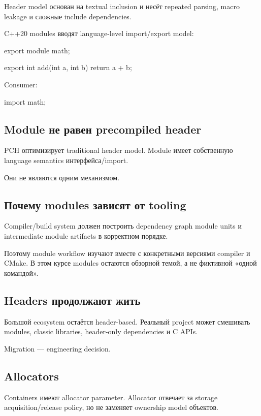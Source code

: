 Header model основан на textual inclusion и несёт repeated parsing, macro
leakage и сложные include dependencies.

C++20 modules вводят language-level import/export model:

\begin{cppcode}
export module math;

export int add(int a, int b) {
    return a + b;
}
\end{cppcode}

Consumer:

\begin{cppcode}
import math;
\end{cppcode}

\subsection{Module не равен precompiled header}

PCH оптимизирует traditional header model. Module имеет собственную language
semantics интерфейса/import.

Они не являются одним механизмом.

\subsection{Почему modules зависят от tooling}

Compiler/build system должен построить dependency graph module units и
intermediate module artifacts в корректном порядке.

Поэтому module workflow изучают вместе с конкретными версиями compiler и CMake.
В этом курсе modules остаются обзорной темой, а не фиктивной «одной командой».

\subsection{Headers продолжают жить}

Большой ecosystem остаётся header-based. Реальный project может смешивать
modules, classic libraries, header-only dependencies и C APIs.

Migration --- engineering decision.

\subsection{Allocators}

Containers имеют allocator parameter. Allocator отвечает за storage
acquisition/release policy, но не заменяет ownership model объектов.

